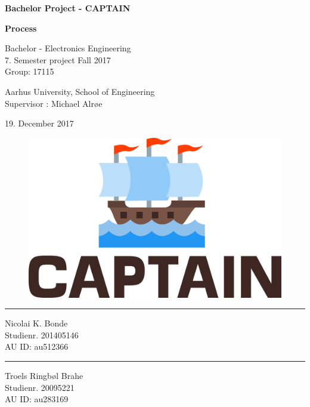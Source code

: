 \begin{titlingpage}
		
	\begin{center}
			{\huge\bfseries Bachelor Project - CAPTAIN}\\
			\vspace{10pt}
			
			{\Huge\bfseries Process}\\
			
			\vspace{20pt}
			
			{Bachelor - Electronics Engineering}\\
			{\large 7. Semester project Fall 2017}\\
			{Group: 17115}
			
			\vspace{10pt}
			
			Aarhus University, School of Engineering\\
			Supervisor : Michael Alrøe
			\vspace{10pt}
			
			19. December 2017
			\vspace{10pt}
			\begin{figure}[H]
				\centering
				\includegraphics[max width=0.7\linewidth]{logo.png}
			\end{figure}
			\vspace{50pt}
			\begin{minipage}{0.25\linewidth}
				\centering
				\hrule
				\vspace{12pt}
				Nicolai K. Bonde\\
				Studienr. 201405146\\
				AU ID: au512366
			\end{minipage}
			\hspace{50pt}
			\begin{minipage}{0.25\linewidth}
				\centering
				\hrule
				\vspace{12pt}
				Troels Ringbøl Brahe\\
				Studienr. 20095221\\
				AU ID: au283169
			\end{minipage}
	\end{center}
\end{titlingpage}